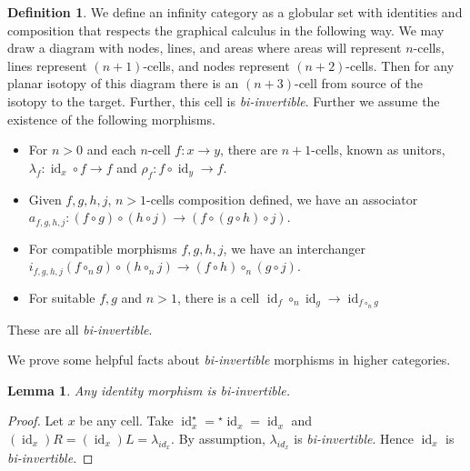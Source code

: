 \documentclass{article}
\newtheorem{lemma}{Lemma}
\theoremstyle{definition}
\newtheorem{definition}{Definition}
\theoremstyle{examplestyle}
\DeclareMathOperator{\id}{id}
\newcommand{\linv}[1]{{}^\star\!#1}
\newcommand{\rinv}[1]{#1^\star}
\begin{document}
\begin{definition}
  \label{def:higher-cat}
  We define an infinity category as a globular set with identities and composition that respects the graphical calculus in the following way. We may draw a diagram with nodes, lines, and areas where areas will represent \(n\)-cells, lines represent \((n+1)\)-cells, and nodes represent \((n+2)\)-cells. Then for any planar isotopy of this diagram there is an \((n+3)\)-cell from source of the isotopy to the target. Further, this cell is \emph{bi-invertible}. Further we assume the existence of the following morphisms.
  \begin{itemize}
  \item For \(n>0\) and each \(n\)-cell \(f: x \to y\), there are \(n+1\)-cells, known as unitors, \(\lambda_f: \id_x \circ f \to f\) and \(\rho_f: f \circ \id_y \to f\).
  \item Given \(f,g,h,j\), \(n>1\)-cells composition defined, we have an associator \(a_{f,g,h,j} : (f \circ g) \circ (h \circ j) \to (f \circ (g \circ h) \circ j)\).
  \item For compatible morphisms \(f,g,h,j\), we have an interchanger \(i_{f,g,h,j}(f \circ_n g) \circ (h \circ_n j) \to (f \circ h) \circ_n (g \circ j)\).
  \item For suitable \(f,g\) and \(n > 1\), there is a cell \(\id_f \circ_n \id_g \to \id_{f \circ_n g}\)
  \end{itemize}
  These are all \emph{bi-invertible}.
\end{definition}

We prove some helpful facts about \emph{bi-invertible} morphisms in higher categories.

\begin{lemma}
  \label{lem:identity}
  Any identity morphism is \emph{bi-invertible}.
\end{lemma}

\begin{proof}
  Let \(x\) be any cell. Take \(\rinv {\id_x} = \linv {\id_x} = \id_x\) and \((\id_x)R = (\id_x)L = \lambda_{id_x}\). By assumption, \(\lambda_{id_x}\) is \emph{bi-invertible}. Hence \(\id_x\) is \emph{bi-invertible}.
\end{proof}
\end{document}

